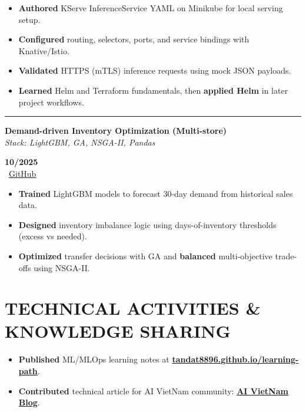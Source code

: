 \documentclass[a4paper,10pt]{extarticle}
\begin{document}
\begin{itemize}
    \item \textbf{Authored} KServe InferenceService YAML on Minikube for local serving setup.
    \item \textbf{Configured} routing, selectors, ports, and service bindings with Knative/Istio.
    \item \textbf{Validated} HTTPS (mTLS) inference requests using mock JSON payloads.
    \item \textbf{Learned} Helm and Terraform fundamentals, then \textbf{applied Helm} in later project workflows.
\end{itemize}

\vspace{1pt}\hrule\vspace{2pt}
\noindent
\begin{minipage}[t]{0.73\textwidth}
    \textbf{Demand-driven Inventory Optimization (Multi-store)} \\
    \textit{Stack: LightGBM, GA, NSGA-II, Pandas}
\end{minipage}
\hfill
\begin{minipage}[t]{0.24\textwidth}
    \begin{flushright}
    \small
    \textbf{10/2025} \\
    \faGithub\ \href{https://github.com/tandat8896/demand-driven-inventory-optimazer}{GitHub}
    \end{flushright}
\end{minipage}

\begin{itemize}
    \item \textbf{Trained} LightGBM models to forecast 30-day demand from historical sales data.
    \item \textbf{Designed} inventory imbalance logic using days-of-inventory thresholds (excess vs needed).
    \item \textbf{Optimized} transfer decisions with GA and \textbf{balanced} multi-objective trade-offs using NSGA-II.
\end{itemize}

\section*{TECHNICAL ACTIVITIES \& KNOWLEDGE SHARING}
\begin{itemize}
    \item \textbf{Published} ML/MLOps learning notes at \href{https://tandat8896.github.io/learning-path/}{\textbf{tandat8896.github.io/learning-path}}.
    \item \textbf{Contributed} technical article for AI VietNam community: \href{https://aioconquer.aivietnam.edu.vn/posts/multilayer-perceptron-issues-gradient-vanishing-dying-relu-zero-initialization-explained}{\textbf{AI VietNam Blog}}.
\end{itemize}
\end{document}

